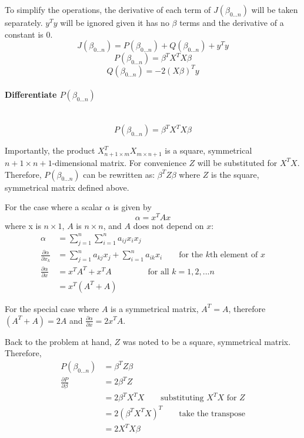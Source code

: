 \documentclass{article}
\begin{document}
	To simplify the operations, the derivative of each term of $J(\beta_{0...n})$ will be taken separately. $y^{T}y$ will be ignored given it has no $\beta$ terms and the derivative of a constant is 0.
	\begin{equation*}
	J(\beta_{0...n}) = P(\beta_{0...n})+Q(\beta_{0...n})+y^Ty
	\end{equation*}
	\begin{equation}
	P(\beta_{0...n})=\beta^{T}X^TX\beta
	\end{equation}
	\begin{equation}
	Q(\beta_{0...n})=-2(X\beta)^Ty
	\end{equation}
	
	\paragraph{Differentiate $P(\beta_{0...n})$}~\\
	\begin{equation*}
	P(\beta_{0...n})=\beta^{T}X^TX\beta
	\end{equation*}
	
	Importantly, the product $X^T_{n+1\times m}X_{m\times n+1}$ is a square, symmetrical $n+1 \times n+1$-dimensional matrix. For convenience $Z$ will be substituted for $X^TX$. Therefore, $P(\beta_{0...n})$ can be rewritten as: $\beta^TZ\beta$ where $Z$ is the square, symmetrical matrix defined above.
	
	For the case where a scalar $\alpha$ is given by
	\begin{equation*}
	\alpha=x^TAx
	\end{equation*}
	where x is $n\times1$, $A$ is $n\times n$, and $A$ does not depend on $x$:
	\begin{align*}
	\alpha &= \sum_{j=1}^{n}\sum_{i=1}^{n}a_{ij}x_ix_j\\
	\frac{\partial\alpha}{\partial x_k}&=\sum_{j=1}^{n}a_{kj}x_j+\sum_{i=1}^{n}a_{ik}x_i\qquad\text{for the $k$th element of $x$}\\
	\frac{\partial\alpha}{\partial x}&=x^TA^T+x^TA\hspace{53pt}\text{for all $k=1,2,...n$}\\
	&=x^T(A^T+A)
	\end{align*}
	
	For the special case where $A$ is a symmetrical matrix, $A^T=A$, therefore $(A^T+A)=2A$ and $\frac{\partial\alpha}{\partial x}=2x^TA$.
	
	Back to the problem at hand, $Z$ was noted to be a square, symmetrical matrix. Therefore,
	\begin{align*}
	P(\beta_{0...n})&=\beta^TZ\beta\\
	\frac{\partial P}{\partial\beta}&=2\beta^TZ\\
	&=2\beta^TX^TX\qquad\text{substituting $X^TX$ for $Z$}\\
	&=2(\beta^TX^TX)^T\qquad\text{take the transpose}\\
	&=2X^TX\beta
	\end{align*}
	
\end{document}
